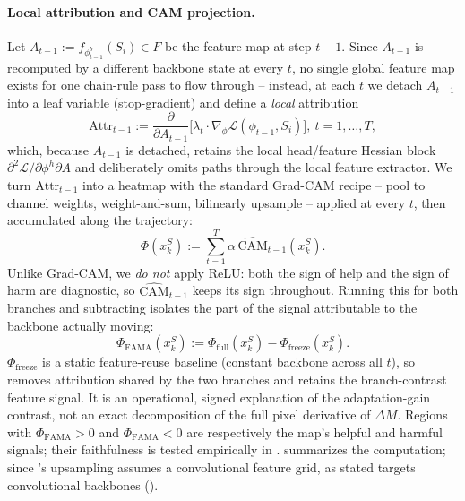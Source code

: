 \paragraph{Local attribution and CAM projection.}
Let $A_{t-1}:=f_{\phi_{t-1}^b}(S_i)\in F$ be the feature map at step $t{-}1$. Since $A_{t-1}$ is recomputed by a different backbone state at every $t$, no single global feature map exists for one chain-rule pass to flow through -- instead, at each $t$ we detach $A_{t-1}$ into a leaf variable (stop-gradient) and define a \emph{local} attribution
\begin{equation}
    \mathrm{Attr}_{t-1} := \frac{\partial}{\partial A_{t-1}}\Big[\lambda_t\!\cdot\!\nabla_\phi\mathcal{L}(\phi_{t-1},S_i)\Big],\ t=1,\dots,T,
    \label{eq:local_attr}
\end{equation}
which, because $A_{t-1}$ is detached, retains the local head/feature Hessian block $\partial^2\mathcal{L}/\partial\phi^h\partial A$ and deliberately omits paths through the local feature extractor. We turn $\mathrm{Attr}_{t-1}$ into a heatmap with the standard Grad-CAM recipe \citep{selvaraju2020grad} -- pool to channel weights, weight-and-sum, bilinearly upsample -- applied at every $t$, then accumulated along the trajectory:
\begin{equation}
    \Phi(x_k^S) := \sum_{t=1}^{T}\alpha\,\widehat{\mathrm{CAM}}_{t-1}(x_k^S).
    \label{eq:branch_saliency}
\end{equation}
Unlike Grad-CAM, we \emph{do not} apply ReLU: both the sign of help and the sign of harm are diagnostic, so $\widehat{\mathrm{CAM}}_{t-1}$ keeps its sign throughout. Running this for both branches and subtracting isolates the part of the signal attributable to the backbone actually moving:
\begin{equation}
    \boxed{\ \Phi_{\mathrm{FAMA}}(x_k^S) := \Phi_{\mathrm{full}}(x_k^S) - \Phi_{\mathrm{freeze}}(x_k^S).\ }
    \label{eq:fama_final}
\end{equation}
$\Phi_{\mathrm{freeze}}$ is a static feature-reuse baseline (constant backbone across all $t$), so  removes attribution shared by the two branches and retains the branch-contrast feature signal. It is an operational, signed explanation of the adaptation-gain contrast, not an exact decomposition of the full pixel derivative of $\Delta M$. Regions with $\Phi_{\mathrm{FAMA}}{>}0$ and $\Phi_{\mathrm{FAMA}}{<}0$ are respectively the map's helpful and harmful signals; their faithfulness is tested empirically in .  summarizes the computation; since 's upsampling assumes a convolutional feature grid, \fama as stated targets convolutional backbones ().

